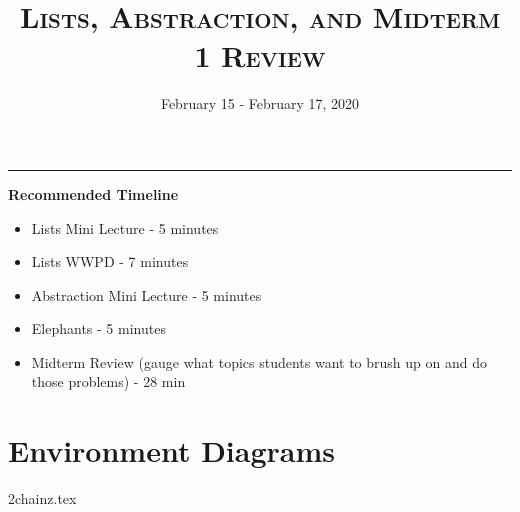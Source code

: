 \documentclass{exam}
\title{\textsc{Lists, Abstraction, and Midterm 1 Review}}
\date{February 15 - February 17, 2020}
\begin{document}
\maketitle
\rule{\textwidth}{0.15em}
\fontsize{12}{15}\selectfont


\begin{guide}
    \textbf{Recommended Timeline}
    \begin{itemize}
        \item Lists Mini Lecture - 5 minutes
        \item Lists WWPD - 7 minutes
        \item Abstraction Mini Lecture - 5 minutes
        \item Elephants - 5 minutes
        \item Midterm Review (gauge what topics students want to brush up on and do those problems) - 28 min
    \end{itemize}
\end{guide}

\newpage
\section{Environment Diagrams}
\begin{questions}
{2chainz.tex}
\end{questions}
\end{document}
